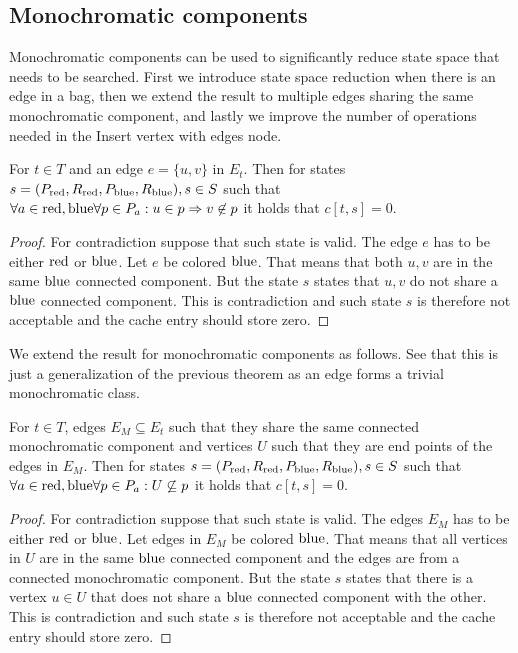 \subsection{Monochromatic components}

Monochromatic components can be used to significantly reduce state space
that needs to be searched. First we introduce state space reduction when
there is an edge in a bag, then we extend the result to multiple edges
sharing the same monochromatic component, and lastly we improve the number of
operations needed in the Insert vertex with edges node.
%
\begin{theorem}
	For \( t \in T \) and an edge \( e = \{u, v\} \) in \( E_t \).
	Then for states \( s = (P_{\text{red}}, R_{\text{red}}, P_{\text{blue}}, R_{\text{blue}}), s \in S \) such that
	\( \forall a \in {\text{red}, \text{blue}} \forall p \in P_a : u \in p \Rightarrow v \not\in p \)
	it holds that \( c[t, s] = 0 \).
\end{theorem}
%
%
\begin{proof}
	For contradiction suppose that such state is valid. The edge \( e \)
	has to be either \( \text{red} \) or \( \text{blue} \). Let \WLOG{} \( e \) be colored \( \text{blue} \).
	That means that both \( u, v \) are in the same \( \text{blue} \) connected component.
	But the state \( s \) states that \( u, v \) do not share a \( \text{blue} \) connected component.
	This is contradiction and such state \( s \) is therefore not acceptable
	and the cache entry should store zero.
\end{proof}
%

We extend the result for monochromatic components as follows.
See that this is just a generalization of the previous theorem
as an edge forms a trivial monochromatic class.
%
\begin{theorem}
	For \( t \in T \),
	edges \( E_M \subseteq E_t \) such that
	they share the same connected monochromatic component
	and vertices \( U \) such that they are end points of the edges in \( E_M \).
	Then for states \( s = (P_{\text{red}}, R_{\text{red}}, P_{\text{blue}}, R_{\text{blue}}), s \in S \) such that
	\( \forall a \in {\text{red}, \text{blue}} \forall p \in P_a : U \not\subseteq p \)
	it holds that \( c[t, s] = 0 \).
\end{theorem}
%
%
\begin{proof}
	For contradiction suppose that such state is valid. The edges \( E_M \)
	has to be either \( \text{red} \) or \( \text{blue} \).
	Let \WLOG{} edges in \( E_M \) be colored \( \text{blue} \).
	That means that all vertices in \( U \) are in the same \( \text{blue} \) connected component
	and the edges are from a connected monochromatic component.
	But the state \( s \) states that there is a vertex \( u \in U \)
	that does not share a \( \text{blue} \) connected component with the other.
	This is contradiction and such state \( s \) is therefore not acceptable
	and the cache entry should store zero.
\end{proof}
%

